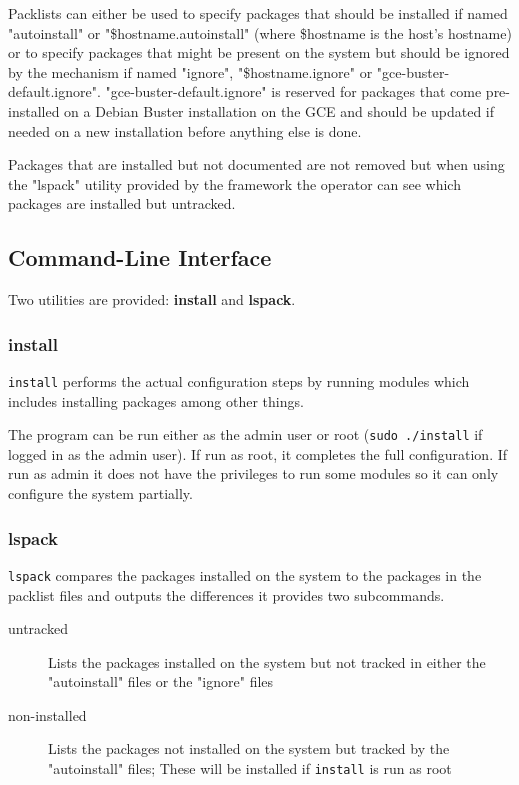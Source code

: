 \documentclass[12pt,a4paper,oneside]{report}
\begin{document}
	Packlists can either be used to specify packages that should be installed if named "autoinstall" or "\$hostname.autoinstall" (where \$hostname is the host's hostname) or to specify packages that might be present on the system but should be ignored by the mechanism if named "ignore", "\$hostname.ignore" or "gce-buster-default.ignore". "gce-buster-default.ignore" is reserved for packages that come pre-installed on a Debian Buster installation on the GCE and should be updated if needed on a new installation before anything else is done.

	\pagebreak
	Packages that are installed but not documented are not removed but when using the "lspack" utility provided by the framework the operator can see which packages are installed but untracked.

	\subsection{Command-Line Interface}
	Two utilities are provided: \textbf{install} and \textbf{lspack}.

	\subsubsection{install}
	\lstinline|install| performs the actual configuration steps by running modules which includes installing packages among other things.

	The program can be run either as the admin user or root (\lstinline|sudo ./install| if logged in as the admin user). If run as root, it completes the full configuration. If run as admin it does not have the privileges to run some modules so it can only configure the system partially.

	\subsubsection{lspack}
	\lstinline|lspack| compares the packages installed on the system to the packages in the packlist files and outputs the differences it provides two subcommands.

	\begin{description}
		\item[untracked] Lists the packages installed on the system but not tracked in either the "autoinstall" files or the "ignore" files
		\item[non-installed] Lists the packages not installed on the system but tracked by the "autoinstall" files; These will be installed if \lstinline|install| is run as root
	\end{description}
\end{document}
